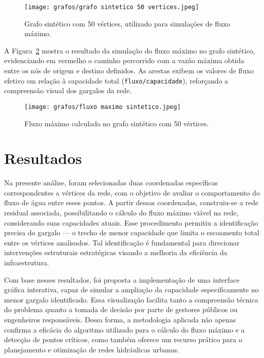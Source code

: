 \documentclass[12pt]{article}
\begin{document}
\begin{figure}[H]
\centering
\texttt{[image: grafos/grafo sintetico 50 vertices.jpeg]}
\caption{Grafo sintético com 50 vértices, utilizado para simulações de fluxo máximo.}
\label{fig:grafo_sintetico_50}
\end{figure}

A Figura~\ref{fig:fluxo_maximo_sintetico} mostra o resultado da simulação do fluxo máximo no grafo sintético, evidenciando em vermelho o caminho percorrido com a vazão máxima obtida entre os nós de origem e destino definidos. As arestas exibem os valores de fluxo efetivo em relação à capacidade total (\texttt{fluxo/capacidade}), reforçando a compreensão visual dos gargalos da rede.

\begin{figure}[H]
\centering
\texttt{[image: grafos/fluxo maximo sintetico.jpeg]}
\caption{Fluxo máximo calculado no grafo sintético com 50 vértices.}
\label{fig:fluxo_maximo_sintetico}
\end{figure}



\section{Resultados}

Na presente análise, foram selecionadas duas coordenadas específicas correspondentes a vértices da rede, com o objetivo de avaliar o comportamento do fluxo de água entre esses pontos. A partir dessas coordenadas, construiu-se a rede residual associada, possibilitando o cálculo do fluxo máximo viável na rede, considerando suas capacidades atuais. Esse procedimento permitiu a identificação precisa do gargalo — o trecho de menor capacidade que limita o escoamento total entre os vértices analisados. Tal identificação é fundamental para direcionar intervenções estruturais estratégicas visando a melhoria da eficiência da infraestrutura.

Com base nesses resultados, foi proposta a implementação de uma interface gráfica interativa, capaz de simular a ampliação da capacidade especificamente no menor gargalo identificado. Essa visualização facilita tanto a compreensão técnica do problema quanto a tomada de decisão por parte de gestores públicos ou engenheiros responsáveis. Dessa forma, a metodologia aplicada não apenas confirma a eficácia do algoritmo utilizado para o cálculo do fluxo máximo e a detecção de pontos críticos, como também oferece um recurso prático para o planejamento e otimização de redes hidráulicas urbanas.
\end{document}
